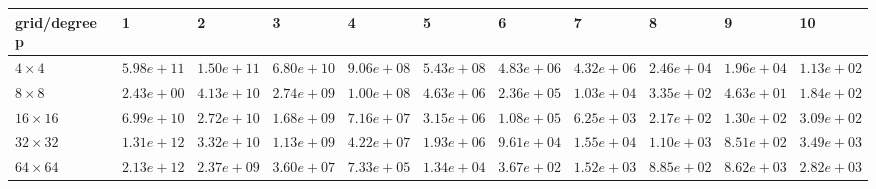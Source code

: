 \begin{tabular}{lllllllllll}
\hline
 grid/degree p   & 1          & 2          & 3          & 4          & 5          & 6          & 7          & 8          & 9          & 10         \\
\hline
 $4 \times 4$    & $5.98e+11$ & $1.50e+11$ & $6.80e+10$ & $9.06e+08$ & $5.43e+08$ & $4.83e+06$ & $4.32e+06$ & $2.46e+04$ & $1.96e+04$ & $1.13e+02$ \\
 $8 \times 8$    & $2.43e+00$ & $4.13e+10$ & $2.74e+09$ & $1.00e+08$ & $4.63e+06$ & $2.36e+05$ & $1.03e+04$ & $3.35e+02$ & $4.63e+01$ & $1.84e+02$ \\
 $16 \times 16$  & $6.99e+10$ & $2.72e+10$ & $1.68e+09$ & $7.16e+07$ & $3.15e+06$ & $1.08e+05$ & $6.25e+03$ & $2.17e+02$ & $1.30e+02$ & $3.09e+02$ \\
 $32 \times 32$  & $1.31e+12$ & $3.32e+10$ & $1.13e+09$ & $4.22e+07$ & $1.93e+06$ & $9.61e+04$ & $1.55e+04$ & $1.10e+03$ & $8.51e+02$ & $3.49e+03$ \\
 $64 \times 64$  & $2.13e+12$ & $2.37e+09$ & $3.60e+07$ & $7.33e+05$ & $1.34e+04$ & $3.67e+02$ & $1.52e+03$ & $8.85e+02$ & $8.62e+03$ & $2.82e+03$ \\
\hline
\end{tabular}